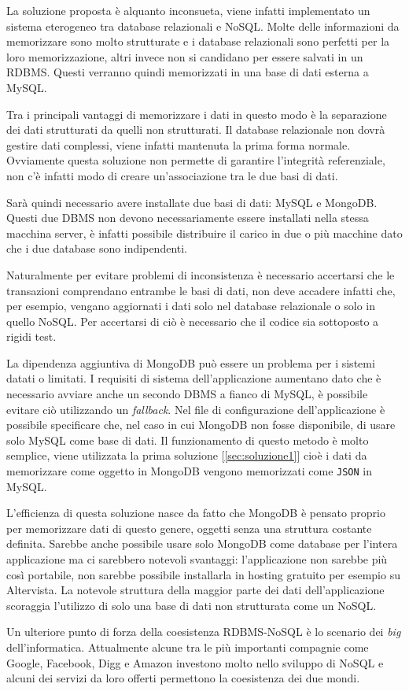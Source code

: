 La soluzione proposta è alquanto inconsueta, viene infatti implementato un sistema eterogeneo tra database relazionali e NoSQL. Molte delle informazioni da memorizzare sono molto strutturate e i database relazionali sono perfetti per la loro memorizzazione, altri invece non si candidano per essere salvati in un RDBMS. Questi verranno quindi memorizzati in una base di dati esterna a MySQL.

Tra i principali vantaggi di memorizzare i dati in questo modo è la separazione dei dati strutturati da quelli non strutturati. Il database relazionale non dovrà gestire dati complessi, viene infatti mantenuta la prima forma normale. Ovviamente questa soluzione non permette di garantire l'integrità referenziale, non c'è infatti modo di creare un'associazione tra le due basi di dati. 

Sarà quindi necessario avere installate due basi di dati: MySQL e MongoDB. Questi due DBMS non devono necessariamente essere installati nella stessa macchina server, è infatti possibile distribuire il carico in due o più macchine dato che i due database sono indipendenti. 

Naturalmente per evitare problemi di inconsistenza è necessario accertarsi che le transazioni comprendano entrambe le basi di dati, non deve accadere infatti che, per esempio, vengano aggiornati i dati solo nel database relazionale o solo in quello NoSQL. Per accertarsi di ciò è necessario che il codice sia sottoposto a rigidi test.

La dipendenza aggiuntiva di MongoDB può essere un problema per i sistemi datati o limitati. I requisiti di sistema dell'applicazione aumentano dato che è necessario avviare anche un secondo DBMS a fianco di MySQL, è possibile evitare ciò utilizzando un \emph{fallback}. Nel file di configurazione dell'applicazione è possibile specificare che, nel caso in cui MongoDB non fosse disponibile, di usare solo MySQL come base di dati. Il funzionamento di questo metodo è molto semplice, viene utilizzata la prima soluzione [\ref{sec:soluzione1}] cioè i dati da memorizzare come oggetto in MongoDB vengono memorizzati come \texttt{JSON} in MySQL.

L'efficienza di questa soluzione nasce da fatto che MongoDB è pensato proprio per memorizzare dati di questo genere, oggetti senza una struttura costante definita. Sarebbe anche possibile usare solo MongoDB come database per l'intera applicazione ma ci sarebbero notevoli svantaggi: l'applicazione non sarebbe più così portabile, non sarebbe possibile installarla in hosting gratuito per esempio su Altervista. La notevole struttura della maggior parte dei dati dell'applicazione scoraggia l'utilizzo di solo una base di dati non strutturata come un NoSQL.

Un ulteriore punto di forza della coesistenza RDBMS-NoSQL è lo scenario dei \emph{big} dell'informatica. Attualmente alcune tra le più importanti compagnie come Google, Facebook, Digg e Amazon investono molto nello sviluppo di NoSQL\cite{rdbmsnosql} e alcuni dei servizi da loro offerti permettono la coesistenza dei due mondi.
